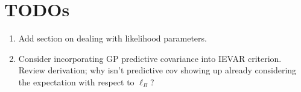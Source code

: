 \documentclass[12pt]{article}
\begin{document}
\section{TODOs}
\begin{enumerate}
\item Add section on dealing with likelihood parameters. 
\item Consider incorporating GP predictive covariance into IEVAR criterion. Review derivation; why isn't predictive cov showing up already considering the 
expectation with respect to $\ell_B$? 
\end{enumerate}
\end{document}
